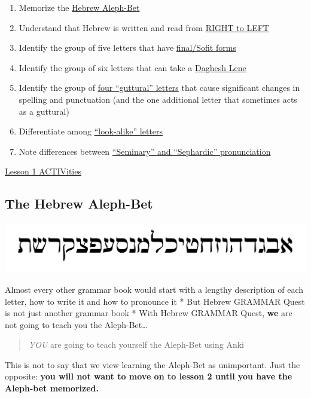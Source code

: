 \documentclass[
]{turabian-researchpaper}
\providecommand{\tightlist}{%
  \setlength{\itemsep}{0pt}\setlength{\parskip}{0pt}}
\begin{document}
\begin{enumerate}
\def\labelenumi{\arabic{enumi}.}
\tightlist
\item
  Memorize the \protect\hyperlink{one_1}{Hebrew Aleph-Bet}
\item
  Understand that Hebrew is written and read from \protect\hyperlink{one_2}{RIGHT to LEFT}
\item
  Identify the group of five letters that have \protect\hyperlink{one_3}{final/Sofit forms}
\item
  Identify the group of six letters that can take a \protect\hyperlink{one_4}{Daghesh Lene}
\item
  Identify the group of \protect\hyperlink{one_5}{four ``guttural'' letters} that cause significant changes in spelling and punctuation (and the one additional letter that sometimes acts as a guttural)
\item
  Differentiate among \protect\hyperlink{one_6}{``look-alike'' letters}
\item
  Note differences between \protect\hyperlink{one_7}{``Seminary'' and ``Sephardic'' pronunciation}
\end{enumerate}

\protect\hyperlink{one_8}{Lesson 1 ACTIVities}

\hypertarget{one_1}{%
\subsection{The Hebrew Aleph-Bet}\label{one_1}}

\begin{center}\includegraphics[width=500pt]{images/alephbet} \end{center}

Almost every other grammar book would start with a lengthy description of each letter, how to write it and how to pronounce it
* But Hebrew GRAMMAR Quest is not just another grammar book
* With Hebrew GRAMMAR Quest, \textbf{we} are not going to teach you the Aleph-Bet\ldots{}

\begin{quote}
\emph{YOU} are going to teach yourself the Aleph-Bet using Anki
\end{quote}

This is not to say that we view learning the Aleph-Bet as unimportant. Just the opposite: \textbf{you will not want to move on to lesson 2 until you have the Aleph-bet memorized.}
\end{document}
